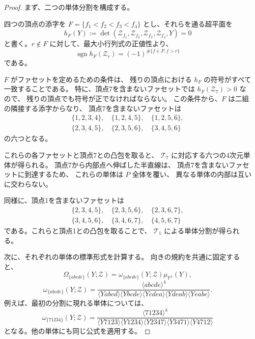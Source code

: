 \documentclass[uplatex,dvipdfmx,a4paper,11pt]{jsarticle}
\renewcommand{\proofname}{Proof}
\newenvironment{myproof}[1][\proofname]
  {\begin{proof}[#1]}
  {\end{proof}}
\numberwithin{equation}{section}
\begin{document}
\begin{myproof}
  まず、二つの単体分割を構成する。

  四つの頂点の添字を
  $F=\{f_1<f_2<f_3<f_4\}$ とし、それらを通る超平面を
  \[
    h_F(Y)
      :=\det(
        \mathcal Z_{f_1},
        \mathcal Z_{f_2},
        \mathcal Z_{f_3},
        \mathcal Z_{f_4},
        Y
      )=0
  \]
  と書く。$r\notin F$ に対して、最大小行列式の正値性より、
  \[
    \operatorname{sgn}h_F(\mathcal Z_r)
      =
      (-1)^{\#\{f\in F:f>r\}}
  \]
  である。

  $F$ がファセットを定めるための条件は、
  残りの頂点における $h_F$ の符号がすべて一致することである。
  特に、頂点7を含まないファセットでは
  $h_F(\mathcal Z_7)>0$ なので、
  残りの頂点でも符号が正でなければならない。
  この条件から、$F$ は二組の隣接する添字からなり、
  頂点7を含まないファセットは
  \[
    \begin{gathered}
      \{1,2,3,4\},\quad
      \{1,2,4,5\},\quad
      \{1,2,5,6\},\\
      \{2,3,4,5\},\quad
      \{2,3,5,6\},\quad
      \{3,4,5,6\}
    \end{gathered}
  \]
  の六つとなる。

  これらの各ファセットと頂点7との凸包を取ると、
  $\mathcal T_7$ に対応する六つの4次元単体が得られる。
  頂点7から内部点へ伸ばした半直線は、
  頂点7を含まないファセットに到達するため、
  これらの単体は $P$ 全体を覆い、
  異なる単体の内部は互いに交わらない。

  同様に、頂点1を含まないファセットは
  \[
    \begin{gathered}
      \{2,3,4,5\},\quad
      \{2,3,5,6\},\quad
      \{2,3,6,7\},\\
      \{3,4,5,6\},\quad
      \{3,4,6,7\},\quad
      \{4,5,6,7\}
    \end{gathered}
  \]
  である。これらと頂点1との凸包を取ることで、
  $\mathcal T_1$ による単体分割が得られる。

  次に、それぞれの単体の標準形式を計算する。
  向きの規約を共通に固定すると、
  \[
    \Omega_{\{abcde\}}(Y;\mathcal Z)
      =
      \omega_{\{abcde\}}(Y;\mathcal Z)
      \mu_{\mathbb P^4}(Y),
  \]
  \[
    \omega_{\{abcde\}}(Y;\mathcal Z)
      =
      \frac{
        \langle abcde\rangle^4
      }{
        \langle Yabcd\rangle
        \langle Ybcde\rangle
        \langle Ycdea\rangle
        \langle Ydeab\rangle
        \langle Yeabc\rangle
      }.
  \]
  例えば、最初の分割に現れる単体については、
  \[
    \omega_{\{71234\}}(Y;\mathcal Z)
      =
      \frac{
        \langle71234\rangle^4
      }{
        \langle Y7123\rangle
        \langle Y1234\rangle
        \langle Y2347\rangle
        \langle Y3471\rangle
        \langle Y4712\rangle
      }
  \]
  となる。他の単体にも同じ公式を適用する。


\end{myproof}
\end{document}
